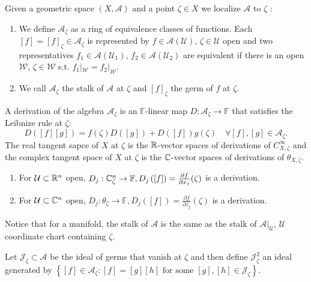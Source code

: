 Given a geometric space $\left( X,\mathcal{A} \right) $ and a point $\zeta \in X$ we localize $\mathcal{A}$ to $\zeta $ :
\begin{enumerate}
  \item We define $\mathcal{A}_\zeta $ as a ring of equivalence classes of functions. Each $[f]=\left[ f \right] _\zeta \in \mathcal{A}_\zeta $ is represented by $f\in \mathcal{A}(\mathcal{U})$, $\zeta\in \mathcal{U}$ open and two representatives $f_1 \in \mathcal{A}\left( \mathcal{U}_1 \right) $, $f_2 \in  \mathcal{A}(\mathcal{U}_2)$ are equivalent if there is an open $\mathcal{W}$, $\zeta \in \mathcal{W}$ s.t. $f_1|_{\mathcal{W}}=f_2|_{\mathcal{W}}$. 
  \item We call $\mathcal{A}_\zeta $ the stalk of $\mathcal{A}$ at $\zeta $ and $\left[ f \right] _{\zeta }$ the germ of $f$ at $\zeta $.
\end{enumerate}
A derivation of the algebra $\mathcal{A}_{\zeta }$ is an $\mathbb{F}$-linear map 
$D:\mathcal{A}_\zeta \to \mathbb{F}$ that satisfies the Leibnize rule at $\zeta$:
\[
  D\left( [f]\left[ g \right]  \right) =f(\zeta)D\left( \left[ g \right]  \right) +D\left( \left[ f \right]  \right) g(\zeta) \quad \forall  \left[ f \right],\left[ g \right] \in \mathcal{A}_{\zeta}. 
\]
The real tangent sapce of $X$ at $\zeta $ is the $\mathbb{R}$-vector spaces of derivations of $C_{X,\zeta }^{\infty}$ and the complex tangent space of $X$ at $\zeta $ is the $\mathbb{C}$-vector spaces of derivations of $\theta _{X,\zeta }$.

\begin{example}
  \begin{enumerate}
    \item For $\mathcal{U}\subset \mathbb{R}^{n}$ open, $D_j:\mathbb{C}_{\zeta }^{n}\to \mathbb{F},D_j\left( \left[ f \right]  \right) =\frac{\partial f}{\partial x_j} (\zeta)$ is a derivation.
    \item For $\mathcal{U}\subset \mathbb{C}^{n}$ open, $D_j:\theta _\zeta \to \mathbb{F}, D_j\left( \left[ f \right]  \right) =\frac{\partial f}{\partial z_j} (\zeta)$ is a derivation.
  \end{enumerate}
\end{example}
Notice that for a manifold, the stalk of $\mathcal{A}$ is the same as the stalk of $\mathcal{A}|_{\mathcal{U}}$, $\mathcal{U}$ coordinate chart containing $\zeta$.

Let $\mathcal{J}_{\zeta }\subset \mathcal{A}$ be the ideal of germs that vanish at $\zeta$ and then define $\mathcal{J}_{\zeta}^2$ an ideal generated by $\left\{[f]\in \mathcal{A}_\zeta:\left[ f \right] =\left[ g \right] \left[ h \right] \text{ for some }\left[ g \right] ,\left[ h \right] \in \mathcal{J}_{\zeta }\right\} $.

